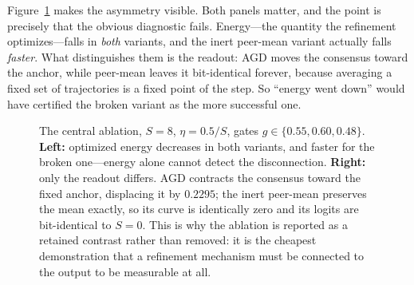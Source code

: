 \documentclass[11pt,a4paper]{article}
\newcommand{\etadim}{\eta}
\theoremstyle{plain}
\theoremstyle{definition}
\theoremstyle{remark}
\begin{document}
Figure~\ref{fig:agd-vs-peer} makes the asymmetry visible. Both panels matter,
and the point is precisely that the obvious diagnostic fails. Energy---the
quantity the refinement optimizes---falls in \emph{both} variants, and the
inert peer-mean variant actually falls \emph{faster}. What distinguishes them is
the readout: AGD moves the consensus toward the anchor, while peer-mean leaves
it bit-identical forever, because averaging a fixed set of trajectories is a
fixed point of the step. So ``energy went down'' would have certified the broken
variant as the more successful one.

\begin{figure}[htbp]
\centering
{}
\caption{The central ablation, $S = 8$, $\etadim = 0.5/S$, gates
$g \in \{0.55, 0.60, 0.48\}$. \textbf{Left:} optimized energy decreases in
both variants, and faster for the broken one---energy alone cannot detect the
disconnection. \textbf{Right:} only the readout differs. AGD contracts the
consensus toward the fixed anchor, displacing it by $0.2295$; the inert
peer-mean preserves the mean exactly, so its curve is identically zero and its
logits are bit-identical to $S = 0$. This is why the ablation is reported as a
retained contrast rather than removed: it is the cheapest demonstration that a
refinement mechanism must be connected to the output to be measurable at all.}
\label{fig:agd-vs-peer}
\end{figure}
\end{document}
